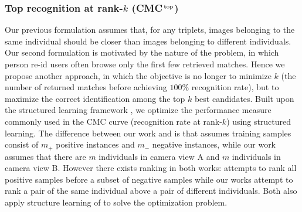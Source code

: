 \documentclass[10pt,twocolumn,letterpaper]{article}
\def\CMCstruct{{\rm CMC$^{\,\rm top}$}\xspace}
\begin{document}
\subsubsection{Top recognition at rank-$k$ (\CMCstruct)}
Our previous formulation assumes that, for any triplets,
images belonging to the same individual should be closer
than images belonging to different individuals.
Our second formulation is motivated by the nature of
the problem, in which person re-id users often
browse only the first few retrieved matches.
Hence we propose another approach,
in which the objective is no longer to
minimize $k$ (the number of returned matches
before achieving $100\%$ recognition rate),
but to maximize the correct identification among
the top $k$ best candidates.
Built upon the structured learning
framework \cite{Joachims2005Support, Narasimhan2013Structural},
we optimize the performance measure commonly used in the CMC curve
(recognition rate at rank-$k$) using structured learning.
The difference between our work and \cite{Narasimhan2013Structural}
is that \cite{Narasimhan2013Structural} assumes training samples
consist of $m_{+}$ positive instances and $m_{-}$ negative instances,
while our work assumes that there are $m$ individuals in camera view A
and $m$ individuals in camera view B.
However there exists ranking in both works:
\cite{Narasimhan2013Structural} attempts to rank all positive samples
before a subset of negative samples while
our works attempt
to rank a pair of the same individual above a pair of different individuals.
Both also apply structure learning of \cite{Joachims2005Support}
to solve the optimization problem.
\end{document}
